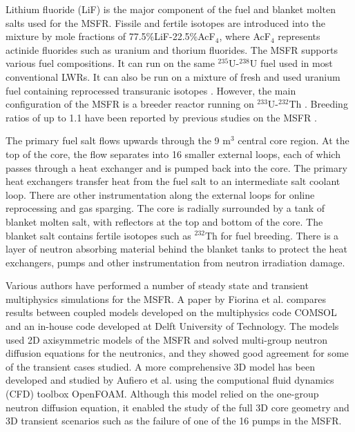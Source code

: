 \documentclass{anstrans}
\begin{document}
Lithium fluoride (LiF) is the major component of the fuel and blanket molten salts used for the MSFR. Fissile and fertile isotopes are introduced into the mixture by mole fractions of 77.5\%LiF-22.5\%AcF$_4$, where AcF$_4$ represents actinide fluorides such as uranium and thorium fluorides. The MSFR supports various fuel compositions. It can run on the same $^{235}$U-$^{238}$U fuel used in most conventional LWRs. It can also be run on a mixture of fresh and used uranium fuel containing reprocessed transuranic isotopes \cite{fiorina_investigation_2013}. However, the main configuration of the MSFR is a breeder reactor running on $^{233}$U-$^{232}$Th \cite{merle-lucotte_launching_2011}. Breeding ratios of up to 1.1 have been reported by previous studies on the MSFR \cite{fiorina_molten_2013}. 

The primary fuel salt flows upwards through the 9 m$^3$ central core region. At the top of the core, the flow separates into 16 smaller external loops, each of which passes through a heat exchanger and is pumped back into the core. The primary heat exchangers transfer heat from the fuel salt to an intermediate salt coolant loop. There are other instrumentation along the external loops for online reprocessing and gas sparging. The core is radially surrounded by a tank of blanket molten salt, with reflectors at the top and bottom of the core. The blanket salt contains fertile isotopes such as $^{232}$Th for fuel breeding. There is a layer of neutron absorbing material behind the blanket tanks to protect the heat exchangers, pumps and other instrumentation from neutron irradiation damage.

Various authors have performed a number of steady state and transient multiphysics simulations for the MSFR. A paper by Fiorina et al. \cite{fiorina_modelling_2014} compares results between coupled models developed on the multiphysics code COMSOL and an in-house code developed at Delft University of Technology. The models used 2D axisymmetric models of the MSFR and solved multi-group neutron diffusion equations for the neutronics, and they showed good agreement for some of the transient cases studied. A more comprehensive 3D model has been developed and studied by Aufiero et al. \cite{aufiero_development_2014} using the computional fluid dynamics (CFD) toolbox OpenFOAM. Although this model relied on the one-group neutron diffusion equation, it enabled the study of the full 3D core geometry and 3D transient scenarios such as the failure of one of the 16 pumps in the MSFR.
\end{document}
